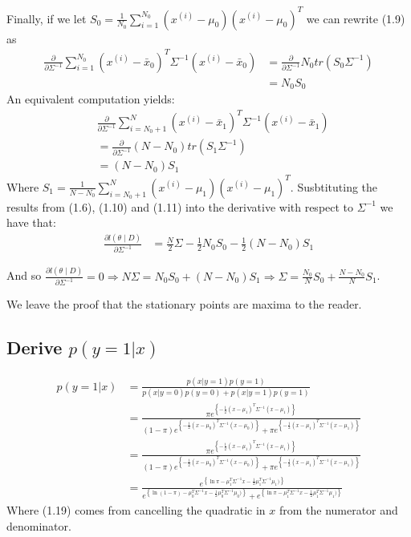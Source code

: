 \documentclass[paper=a4, fontsize=11pt]{scrartcl} %
\numberwithin{equation}{section} %
\numberwithin{figure}{section} %
\numberwithin{table}{section} %
\begin{document}
	Finally, if we let \(S_0 = \frac{1}{N_0}\sum_{i=1}^{N_0} (x^{(i)}-\mu_{0}) (x^{(i)}-\mu_{0})^T\) we can rewrite (1.9) as
	\begin{align}
	\frac{\partial}{\partial \Sigma^{-1}}\sum_{i=1}^{N_0}  (x^{(i)}-\bar{x}_0)^T\Sigma^{-1}(x^{(i)}-\bar{x}_0) &= \frac{\partial}{\partial \Sigma^{-1}} N_0tr\left(S_0\Sigma^{-1}\right) \\
	&= N_0S_0
	\end{align}
	An equivalent computation yields:
	\begin{align}
	& \frac{\partial}{\partial \Sigma^{-1}}\sum_{i=N_0 + 1}^{N}  (x^{(i)}-\bar{x}_1)^T\Sigma^{-1}(x^{(i)}-\bar{x}_1) \\
	&= \frac{\partial}{\partial \Sigma^{-1}} (N-N_0)tr\left(S_1\Sigma^{-1}\right) \\
	&= (N-N_0)S_1
	\end{align}
	Where \(S_1 = \frac{1}{N-N_0}\sum_{i=N_0+1}^{N} (x^{(i)}-\mu_{1}) (x^{(i)}-\mu_{1})^T\).
	Susbtituting the results from (1.6), (1.10) and (1.11) into the derivative with respect to \(\Sigma^{-1}\) we have that:
	\begin{align}
	\frac{\partial l(\theta \mid D)}{\partial \Sigma^{-1}} &= \frac{N}{2}\Sigma -\frac{1}{2}N_0S_0  -\frac{1}{2}(N-N_0)S_1
	\end{align}
	
	And so \( \frac{\partial l(\theta \mid D)}{\partial \Sigma^{-1}} = 0 \Rightarrow N\Sigma =N_0S_0  +(N-N_0)S_1 \Rightarrow \Sigma = \frac{N_0}{N}S_0 + \frac{N-N_0}{N}S_1 \).
	
	We leave the proof that the stationary points are maxima to the reader.
	
	\subsection{Derive \(p(y = 1|x)\)}
	
	\begin{align}
	p(y = 1|x) &= \frac{p(x | y = 1)p(y=1)}{p(x | y = 0)p(y=0) + p(x | y = 1)p(y=1)}\\
	&= \frac{\pi e^{\left\{-\frac{1}{2}(x-\mu_1)^T\Sigma^{-1}(x-\mu_1)\right\}}}{
	(1 - \pi) e^{\left\{-\frac{1}{2}(x-\mu_0)^T\Sigma^{-1}(x-\mu_0)\right\}} + \pi e^{\left\{-\frac{1}{2}(x-\mu_1)^T\Sigma^{-1}(x-\mu_1)\right\}}}\\
	&= \frac{\pi e^{\left\{-\frac{1}{2}(x-\mu_1)^T\Sigma^{-1}(x-\mu_1)\right\}}}{
	(1 - \pi) e^{\left\{-\frac{1}{2}(x-\mu_0)^T\Sigma^{-1}(x-\mu_0)\right\}} + \pi e^{\left\{-\frac{1}{2}(x-\mu_1)^T\Sigma^{-1}(x-\mu_1)\right\}}} \\
	&= \frac{e^{\left\{\ln\pi-\mu_1^T\Sigma^{-1}x -\frac{1}{2}\mu_1^T\Sigma^{-1}\mu_1)\right\}}}{
		e^{\left\{\ln(1-\pi)-\mu_0^T\Sigma^{-1}x -\frac{1}{2}\mu_0^T\Sigma^{-1}\mu_0)\right\}}+e^{\left\{\ln\pi-\mu_1^T\Sigma^{-1}x -\frac{1}{2}\mu_1^T\Sigma^{-1}\mu_1)\right\}}
		}
	\end{align}
	Where (1.19) comes from cancelling the quadratic in \(x\) from the numerator and denominator.
	
\end{document}
